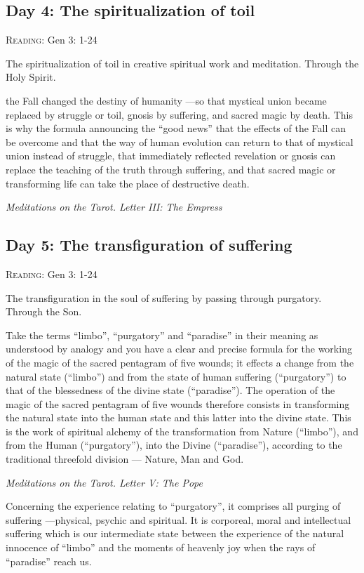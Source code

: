 \subsection*{Day 4: The spiritualization of toil}
\textsc{Reading}: Gen 3: 1-24

The spiritualization of toil in creative spiritual work and meditation. Through the Holy Spirit.

\begin{quotationx}
the Fall changed the destiny of humanity —so that mystical union became replaced by struggle or
toil, gnosis by suffering, and sacred magic by death. This is why the formula announcing the “good news” that the
effects of the Fall can be overcome and that the way of human evolution can return to that of mystical union instead of
struggle, that immediately reflected revelation or gnosis can replace the teaching of the truth through suffering, and
that sacred magic or transforming life can take the place of destructive death.
\begin{flushright}\textit{Meditations on the Tarot. Letter III: The Empress}\end{flushright} 
\end{quotationx}

\subsection*{Day 5: The transfiguration of suffering}
\textsc{Reading}: Gen 3: 1-24

The transfiguration in the soul of suffering by passing through purgatory. Through the Son.

\begin{quotationx}
Take the terms “limbo”, “purgatory” and “paradise” in their meaning as understood by analogy and you have a clear and
precise formula for the working of the magic of the sacred pentagram of five wounds; it effects a change from the
natural state (“limbo”) and from the state of human suffering (“purgatory”) to that of the blessedness of the divine
state (“paradise”). The operation of the magic of the sacred pentagram of five wounds therefore consists in
transforming the natural state into the human state and this latter into the divine state. This is the work of
spiritual alchemy of the transformation from Nature (“limbo”), and from the Human (“purgatory”), into the Divine
(“paradise”), according to the traditional threefold division — Nature, Man and God. 
\begin{flushright}\textit{Meditations on the Tarot. Letter V: The Pope}\end{flushright} 

\end{quotationx}
Concerning the experience relating to “purgatory”, it comprises all purging of suffering —physical,
psychic and spiritual. It is corporeal, moral and intellectual suffering which is our intermediate state between the
experience of the natural innocence of “limbo” and the moments of heavenly joy when the rays of “paradise” reach us.

